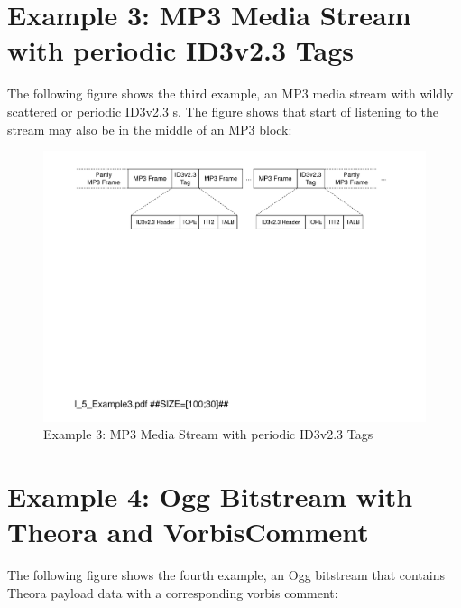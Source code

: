 \section{Example 3: MP3 Media Stream with periodic ID3v2.3 Tags}
\label{sec:Example3MP3FileWithID3v23AndID3v11}

The following figure shows the third example, an MP3 media stream with wildly scattered or periodic ID3v2.3 \TERMtag{}s. The figure shows that start of listening to the stream may also be in the middle of an MP3 block:

\begin{figure}[H]
	\centering
	\includegraphics[width=1.00\textwidth]{Figures/Part_I/I_5_Example3.pdf}
	\caption{Example 3: MP3 Media Stream with periodic ID3v2.3 Tags}
	\label{fig:Example3MP3filewithtwoID3tags}
\end{figure}


\section{Example 4: Ogg Bitstream with Theora and VorbisComment}
\label{sec:Example4MP3FileWithID3v23AndID3v11}

The following figure shows the fourth example, an Ogg bitstream that contains Theora payload data with a corresponding vorbis comment:

